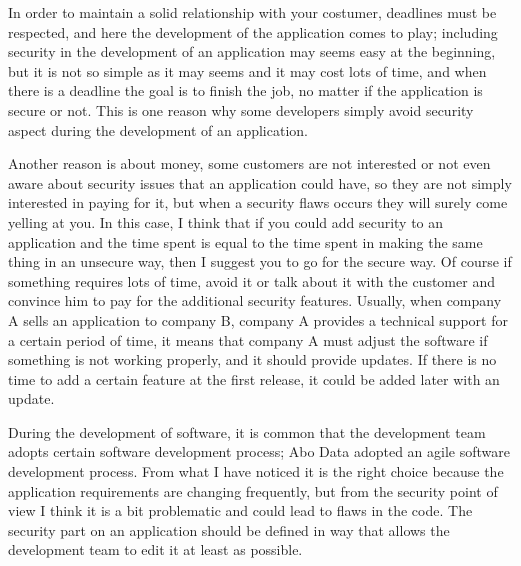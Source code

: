 In order to maintain a solid relationship with your costumer, deadlines must be respected, and here the development of the application comes to play; including security in the development of an application may seems easy at the beginning, but it is not so simple as it may seems and it may cost lots of time, and when there is a deadline the goal is to finish the job, no matter if the application is secure or not.\newline
This is one reason why some developers simply avoid security aspect during the development of an application.\newline

Another reason is about money, some customers are not interested or not even aware about security issues that an application could have, so they are not simply interested in paying for it, but when a security flaws occurs they will surely come yelling at you.\newline
In this case, I think that if you could add security to an application and the time spent is equal to the time spent in making the same thing in an unsecure way, then I suggest you to go for the secure way.\newline
Of course if something requires lots of time, avoid it or talk about it with the customer and convince him to pay for the additional security features.\newline
Usually, when company A sells an application to company B, company A provides a technical support for a certain period of time, it means that company A must adjust the software if something is not working properly, and it should provide updates.
If there is no time to add a certain feature at the first release, it could be added later with an update.\newline

During the development of software, it is common that the development team adopts certain software development process; Abo Data adopted an agile software development process.\newline
From what I have noticed it is the right choice because the application requirements are changing frequently, but from the security point of view I think it is a bit problematic and could lead to flaws in the code.\newline
The security part on an application should be defined in way that allows the development team to edit it at least as possible.\newline

